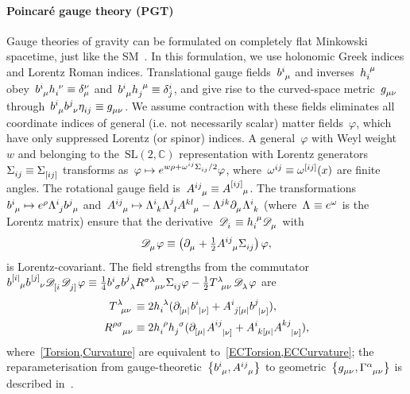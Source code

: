 \documentclass[aps,prd,reprint,preprintnumbers,showpacs,floatfix,nofootinbib,superscript address]{revtex4-2}
\begin{document}
\paragraph*{Poincar\'e gauge theory (PGT)} Gauge theories of gravity can be formulated on completely flat Minkowski spacetime, just like the SM~\cite{Lasenby:2015dba}. In this formulation, we use holonomic Greek indices and Lorentz Roman indices. Translational gauge fields~$\FieldB{^i_\mu}$ and inverses~$\FieldH{_i^\mu}$ obey~$\FieldB{^i_\mu}\FieldH{_i^\nu}\equiv\FieldDelta{_\mu^\nu}$ and~$\FieldB{^i_\mu}\FieldH{_j^\mu}\equiv\FieldDelta{_j^i}$, and give rise to the curved-space metric~$\FieldG{_{\mu\nu}}$ through~$\FieldB{^i_\mu}\FieldB{^j_\nu}\FieldEta{_{ij}}\equiv\FieldG{_{\mu\nu}}$. We assume contraction with these fields eliminates all coordinate indices of general (i.e. not necessarily scalar) matter fields~$\varphi$, which have only suppressed Lorentz (or spinor) indices. A general~$\varphi$ with Weyl weight~$w$ and belonging to the~$\mathrm{SL}(2,\mathbb{C})$ representation with Lorentz generators~$\FieldSigma{_{ij}}\equiv\FieldSigma{_{[ij]}}$ transforms as~$\varphi\mapsto e^{w\rho+\FieldOmega{^{ij}}\FieldSigma{_{ij}}/2}\varphi$, where~$\FieldOmega{^{ij}}\equiv\FieldOmega{^{[ij]}}(x)$ are finite angles. The rotational gauge field is~$\FieldA{^{ij}_\mu}\equiv\FieldA{^{[ij]}_\mu}$. The transformations~$\FieldB{^i_\mu}\mapsto e^{\rho}\FieldLambda{^i_j}\FieldB{^j_\mu}$ and~$\FieldA{^{ij}_\mu}\mapsto\FieldLambda{^i_k}\FieldLambda{^j_l}\FieldA{^{kl}_\mu}-\FieldLambda{^{jk}}\PD{_\mu}\FieldLambda{^i_k}$ (where~$\FieldLambda{}\equiv e^{\FieldOmega{}}$ is the Lorentz matrix) ensure that the derivative~$\SCovD{_i}\equiv\FieldH{_i^\mu}\SCovD{_\mu}$ with
\begin{equation}\label{PGTDer}
\SCovD{_\mu}\varphi\equiv\left(\PD{_\mu}+\tfrac{1}{2}\FieldA{^{ij}_\mu}\FieldSigma{_{ij}}\right)\varphi,
\end{equation}
is Lorentz-covariant. The field strengths from the commutator~$\FieldB{^{[i|}_\mu}\FieldB{^{|j]}_\nu}\SCovD{_{[i}}\SCovD{_{j]}}\varphi\equiv\frac{1}{4}\FieldB{^{i}_\sigma}\FieldB{^j_\lambda}\MAGF{^{\sigma\lambda}_{\mu\nu}}\FieldSigma{_{ij}}\varphi-\frac{1}{2}\MAGT{^\lambda_{\mu\nu}}\SCovD{_\lambda}\varphi$ are
\begin{subequations}
\begin{align}	\MAGT{^\lambda_{\mu\nu}}&\equiv2\FieldH{_i^\lambda}(\PD{_{[\mu|}}\FieldB{^i_{|\nu]}}+\FieldA{^i_j_{[\mu|}}\FieldB{^j_{|\nu]}}),\label{Torsion}\\
\MAGF{^{\rho\sigma}_{\mu\nu}}&\equiv2\FieldH{_i^\rho}\FieldH{_j^\sigma}(\PD{_{[\mu|}}\FieldA{^{ij}_{|\nu]}}+\FieldA{^i_k_{[\mu|}}\FieldA{^{kj}_{|\nu]}}),\label{Curvature}
\end{align}
\end{subequations}
where~\cref{Torsion,Curvature} are equivalent to~\cref{ECTorsion,ECCurvature}; the reparameterisation from gauge-theoretic~$\big\{\FieldB{^i_\mu},\FieldA{^{ij}_\mu}\big\}$ to geometric~$\big\{\FieldG{_{\mu\nu}},\MAGA{^\alpha_{\mu}_{\nu}}\big\}$ is described in~\cite{Blagojevic:2002,Lasenby:2015dba}.
\end{document}
